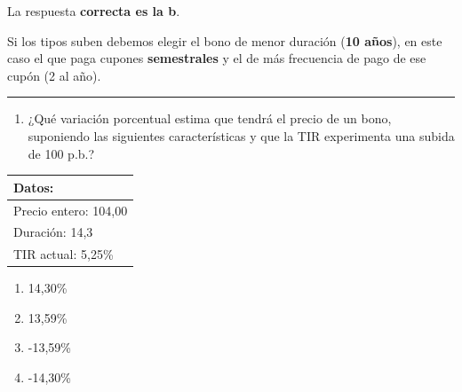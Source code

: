 \documentclass[
  letterpaper,
  DIV=11,
  numbers=noendperiod]{scrreprt}
\providecommand{\tightlist}{%
  \setlength{\itemsep}{0pt}\setlength{\parskip}{0pt}}\usepackage{longtable,booktabs,array}
\begin{document}
\begin{tcolorbox}[enhanced jigsaw, left=2mm, opacityback=0, colback=white, breakable, arc=.35mm, bottomrule=.15mm, rightrule=.15mm, toprule=.15mm, leftrule=.75mm, colframe=quarto-callout-tip-color-frame]
\begin{minipage}[t]{5.5mm}
\textcolor{quarto-callout-tip-color}{\faLightbulb}
\end{minipage}%
\begin{minipage}[t]{\textwidth - 5.5mm}

La respuesta \textbf{correcta es la b}.

Si los tipos suben debemos elegir el bono de menor duración (\textbf{10
años}), en este caso el que paga cupones \textbf{semestrales} y el de
más frecuencia de pago de ese cupón (2 al año).

\end{minipage}%
\end{tcolorbox}

\begin{center}\rule{0.5\linewidth}{0.5pt}\end{center}

\begin{enumerate}
\def\labelenumi{\arabic{enumi}.}
\setcounter{enumi}{96}
\tightlist
\item
  ¿Qué variación porcentual estima que tendrá el precio de un bono,
  suponiendo las siguientes características y que la TIR experimenta una
  subida de 100 p.b.?
\end{enumerate}

\begin{longtable}[]{@{}l@{}}
\toprule()
\textbf{Datos:} \\
\midrule()
\endhead
Precio entero: 104,00 \\
Duración: 14,3 \\
TIR actual: 5,25\% \\
\bottomrule()
\end{longtable}

\begin{enumerate}
\def\labelenumi{\alph{enumi})}
\item
  14,30\%
\item
  13,59\%
\item
  -13,59\%
\item
  -14,30\%
\end{enumerate}
\end{document}

